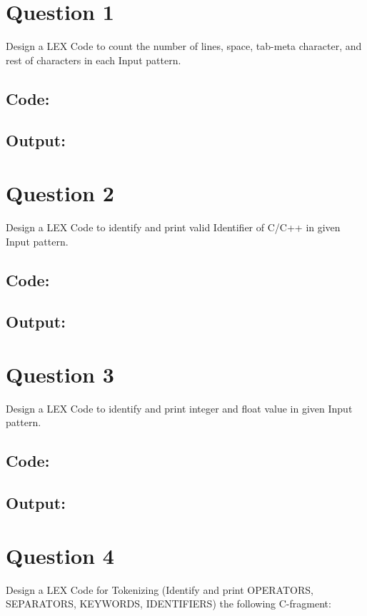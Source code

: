 \documentclass{article}
\begin{document}
\newpage
\section*{Question 1}
Design a LEX Code to count the number of lines, space, 
tab-meta character, and rest of characters in each Input 
pattern. 
\subsection*{Code:}

\newpage
\subsection*{Output:}


\newpage
\section*{Question 2}
Design a LEX Code to identify and print valid Identifier of 
C/C++ in given Input pattern. 
\subsection*{Code:}

\newpage
\subsection*{Output:}


\newpage
\section*{Question 3}
Design a LEX Code to identify and print integer and float 
value in given Input pattern.
\subsection*{Code:}

\newpage
\subsection*{Output:}


\newpage
\section*{Question 4}
Design a LEX Code for Tokenizing 
(Identify and print OPERATORS, SEPARATORS, KEYWORDS, 
IDENTIFIERS) 
the following C-fragment:
\end{document}
